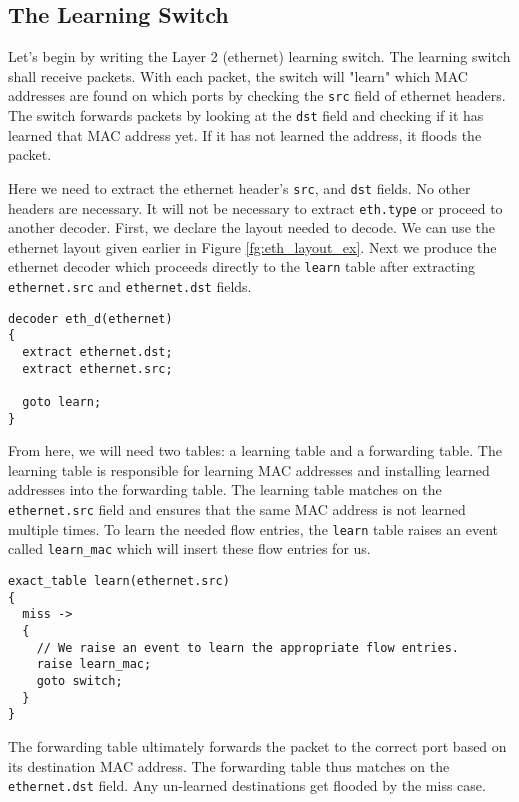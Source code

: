 \subsection{The Learning Switch} \label{learning_switch}

Let's begin by writing the Layer 2 (ethernet) learning switch. The learning switch shall receive packets. With each packet, the switch will "learn" which MAC addresses are found on which ports by checking the \texttt{src} field of ethernet headers. The switch forwards packets by looking at the \texttt{dst} field and checking if it has learned that MAC address yet. If it has not learned the address, it floods the packet.

Here we need to extract the ethernet header's \texttt{src}, and \texttt{dst} fields. No other headers are necessary. It will not be necessary to extract \texttt{eth.type} or proceed to another decoder. First, we declare the layout needed to decode. We can use the ethernet layout given earlier in Figure \ref{fg:eth_layout_ex}. Next we produce the ethernet decoder which proceeds directly to the \texttt{learn} table after extracting \texttt{ethernet.src} and \texttt{ethernet.dst} fields.

\begin{lstlisting}
decoder eth_d(ethernet)
{
  extract ethernet.dst;
  extract ethernet.src;
  
  goto learn;
}
\end{lstlisting}

From here, we will need two tables: a learning table and a forwarding table. The learning table is responsible for learning MAC addresses and installing learned addresses into the forwarding table. The learning table matches on the \texttt{ethernet.src} field and ensures that the same MAC address is not learned multiple times. To learn the needed flow entries, the \texttt{learn} table raises an event called \texttt{learn\_mac} which will insert these flow entries for us.

\begin{lstlisting}
exact_table learn(ethernet.src)
{
  miss ->
  {
  	// We raise an event to learn the appropriate flow entries.
  	raise learn_mac;
    goto switch;
  }
}
\end{lstlisting}

The forwarding table ultimately forwards the packet to the correct port based on its destination MAC address. The forwarding table thus matches on the \texttt{ethernet.dst} field. Any un-learned destinations get flooded by the miss case.

